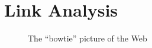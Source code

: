 \chapter{Link Analysis}\label{chap:link-analysis}

\begin{figure}[H]
\centering
\scalebox{1}{
    
}
\caption{The ``bowtie'' picture of the Web}
\label{fig:bowtie-web}
\end{figure}
